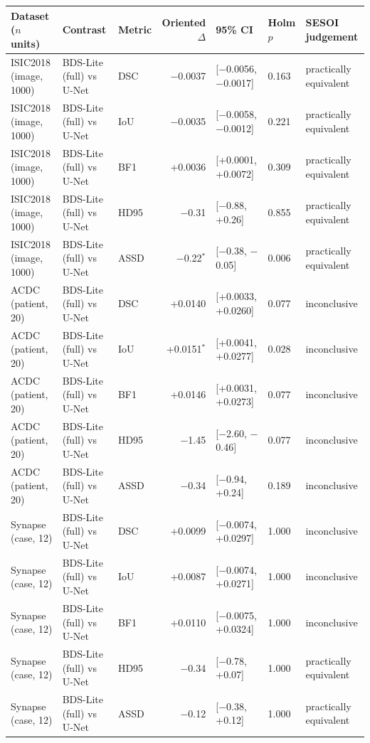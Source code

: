 \begin{tabular}{lllrlll}
\toprule
Dataset ($n$ units) & Contrast & Metric & Oriented $\Delta$ & 95\% CI & Holm $p$ & SESOI judgement \\
\midrule
ISIC2018 (image, 1000) & BDS-Lite (full) vs U-Net & DSC & $-$0.0037 & [$-$0.0056, $-$0.0017] & 0.163 & practically equivalent \\
ISIC2018 (image, 1000) & BDS-Lite (full) vs U-Net & IoU & $-$0.0035 & [$-$0.0058, $-$0.0012] & 0.221 & practically equivalent \\
ISIC2018 (image, 1000) & BDS-Lite (full) vs U-Net & BF1 & +0.0036 & [+0.0001, +0.0072] & 0.309 & practically equivalent \\
ISIC2018 (image, 1000) & BDS-Lite (full) vs U-Net & HD95 & $-$0.31 & [$-$0.88, +0.26] & 0.855 & practically equivalent \\
ISIC2018 (image, 1000) & BDS-Lite (full) vs U-Net & ASSD & $-$0.22$^{*}$ & [$-$0.38, $-$0.05] & 0.006 & practically equivalent \\
\midrule
ACDC (patient, 20) & BDS-Lite (full) vs U-Net & DSC & +0.0140 & [+0.0033, +0.0260] & 0.077 & inconclusive \\
ACDC (patient, 20) & BDS-Lite (full) vs U-Net & IoU & +0.0151$^{*}$ & [+0.0041, +0.0277] & 0.028 & inconclusive \\
ACDC (patient, 20) & BDS-Lite (full) vs U-Net & BF1 & +0.0146 & [+0.0031, +0.0273] & 0.077 & inconclusive \\
ACDC (patient, 20) & BDS-Lite (full) vs U-Net & HD95 & $-$1.45 & [$-$2.60, $-$0.46] & 0.077 & inconclusive \\
ACDC (patient, 20) & BDS-Lite (full) vs U-Net & ASSD & $-$0.34 & [$-$0.94, +0.24] & 0.189 & inconclusive \\
\midrule
Synapse (case, 12) & BDS-Lite (full) vs U-Net & DSC & +0.0099 & [$-$0.0074, +0.0297] & 1.000 & inconclusive \\
Synapse (case, 12) & BDS-Lite (full) vs U-Net & IoU & +0.0087 & [$-$0.0074, +0.0271] & 1.000 & inconclusive \\
Synapse (case, 12) & BDS-Lite (full) vs U-Net & BF1 & +0.0110 & [$-$0.0075, +0.0324] & 1.000 & inconclusive \\
Synapse (case, 12) & BDS-Lite (full) vs U-Net & HD95 & $-$0.34 & [$-$0.78, +0.07] & 1.000 & practically equivalent \\
Synapse (case, 12) & BDS-Lite (full) vs U-Net & ASSD & $-$0.12 & [$-$0.38, +0.12] & 1.000 & practically equivalent \\
\bottomrule
\end{tabular}
